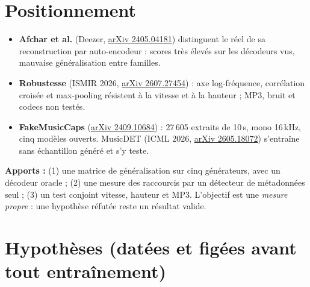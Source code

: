 \documentclass[11pt,a4paper]{article}
\newcounter{fig}
\begin{document}
\section{Positionnement}

\begin{itemize}
  \item \textbf{Afchar et al.} (Deezer, \href{https://arxiv.org/abs/2405.04181}{arXiv 2405.04181}) distinguent le réel de sa reconstruction par auto-encodeur : scores très élevés sur les décodeurs vus, mauvaise généralisation entre familles.
  \item \textbf{Robustesse} (ISMIR 2026, \href{https://arxiv.org/abs/2607.27454}{arXiv 2607.27454}) : axe log-fréquence, corrélation croisée et max-pooling résistent à la vitesse et à la hauteur ; MP3, bruit et codecs non testés.
  \item \textbf{FakeMusicCaps} (\href{https://arxiv.org/abs/2409.10684}{arXiv 2409.10684}) : 27\,605 extraits de 10\,s, mono 16\,kHz, cinq modèles ouverts. MusicDET (ICML 2026, \href{https://arxiv.org/pdf/2605.18072}{arXiv 2605.18072}) s'entraîne sans échantillon généré et s'y teste.
\end{itemize}

\textbf{Apports :} (1) une matrice de généralisation sur cinq générateurs, avec un \og décodeur oracle\fg{} ; (2) une mesure des raccourcis par un détecteur de métadonnées seul ; (3) un test conjoint vitesse, hauteur et MP3. L'objectif est une \emph{mesure propre} : une hypothèse réfutée reste un résultat valide.

\newpage

\section{Hypothèses (datées et figées avant tout entraînement)}
\end{document}
